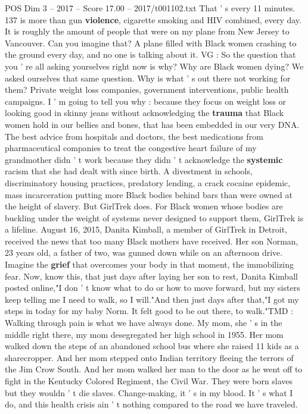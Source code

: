 \begin{textsample}{POS Dim 3 – 2017 – Score 17.00 – 2017/t001102.txt}
That ' s every 11 minutes. 137 is more than gun \textbf{violence}, cigarette smoking and HIV combined, every day.
It is roughly the amount of people that were on my plane from New Jersey to Vancouver.
Can you imagine that?
A plane filled with Black women crashing to the ground every day, and no one is talking about it.
VG : So the question that you ' re all asking yourselves right now is why?
Why are Black women dying?
We asked ourselves that same question.
Why is what ' s out there not working for them?
Private weight loss companies, government interventions, public health campaigns.
I ' m going to tell you why : because they focus on weight loss or looking good in skinny jeans without acknowledging the \textbf{trauma} that Black women hold in our bellies and bones, that has been embedded in our very DNA.
The best advice from hospitals and doctors, the best medications from pharmaceutical companies to treat the congestive heart failure of my grandmother didn ' t work because they didn ' t acknowledge the \textbf{systemic} racism that she had dealt with since birth.
A divestment in schools, discriminatory housing practices, predatory lending, a crack cocaine epidemic, mass incarceration putting more Black bodies behind bars than were owned at the height of slavery.
But GirlTrek does.
For Black women whose bodies are buckling under the weight of systems never designed to support them, GirlTrek is a lifeline.
August 16, 2015, Danita Kimball, a member of GirlTrek in Detroit, received the news that too many Black mothers have received.
Her son Norman, 23 years old, a father of two, was gunned down while on an afternoon drive.
Imagine the \textbf{grief} that overcomes your body in that moment, the immobilizing fear.
Now, know this, that just days after laying her son to rest, Danita Kimball posted online,"I don ' t know what to do or how to move forward, but my sisters keep telling me I need to walk, so I will."And then just days after that,"I got my steps in today for my baby Norm.
It felt good to be out there, to walk."TMD : Walking through pain is what we have always done.
My mom, she ' s in the middle right there, my mom desegregated her high school in 1955.
Her mom walked down the steps of an abandoned school bus where she raised 11 kids as a sharecropper.
And her mom stepped onto Indian territory fleeing the terrors of the Jim Crow South.
And her mom walked her man to the door as he went off to fight in the Kentucky Colored Regiment, the Civil War.
They were born slaves but they wouldn ' t die slaves.
Change-making, it ' s in my blood.
It ' s what I do, and this health crisis ain ' t nothing compared to the road we have traveled.

\end{textsample}
